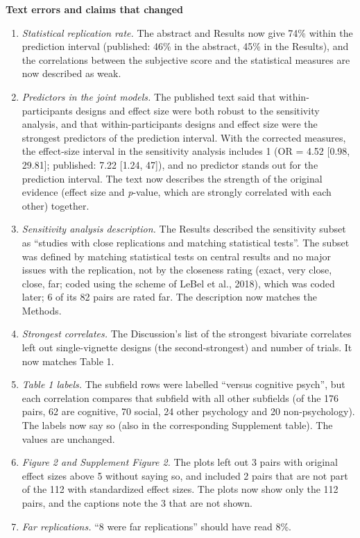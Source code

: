 \documentclass[
  english,
  a4paper,
]{article}
\providecommand{\tightlist}{%
  \setlength{\itemsep}{0pt}\setlength{\parskip}{0pt}}
\begin{document}
\textbf{Text errors and claims that changed}

\begin{enumerate}
\def\labelenumi{\arabic{enumi}.}
\tightlist
\item
  \emph{Statistical replication rate.} The abstract and Results now give 74\% within the prediction interval (published: 46\% in the abstract, 45\% in the Results), and the correlations between the subjective score and the statistical measures are now described as weak.
\item
  \emph{Predictors in the joint models.} The published text said that within-participants designs and effect size were both robust to the sensitivity analysis, and that within-participants designs and effect size were the strongest predictors of the prediction interval. With the corrected measures, the effect-size interval in the sensitivity analysis includes 1 (OR = 4.52 {[}0.98, 29.81{]}; published: 7.22 {[}1.24, 47{]}), and no predictor stands out for the prediction interval. The text now describes the strength of the original evidence (effect size and \emph{p}-value, which are strongly correlated with each other) together.
\item
  \emph{Sensitivity analysis description.} The Results described the sensitivity subset as ``studies with close replications and matching statistical tests''. The subset was defined by matching statistical tests on central results and no major issues with the replication, not by the closeness rating (exact, very close, close, far; coded using the scheme of LeBel et al., 2018), which was coded later; 6 of its 82 pairs are rated far. The description now matches the Methods.
\item
  \emph{Strongest correlates.} The Discussion's list of the strongest bivariate correlates left out single-vignette designs (the second-strongest) and number of trials. It now matches Table 1.
\item
  \emph{Table 1 labels.} The subfield rows were labelled ``versus cognitive psych'', but each correlation compares that subfield with all other subfields (of the 176 pairs, 62 are cognitive, 70 social, 24 other psychology and 20 non-psychology). The labels now say so (also in the corresponding Supplement table). The values are unchanged.
\item
  \emph{Figure 2 and Supplement Figure 2.} The plots left out 3 pairs with original effect sizes above 5 without saying so, and included 2 pairs that are not part of the 112 with standardized effect sizes. The plots now show only the 112 pairs, and the captions note the 3 that are not shown.
\item
  \emph{Far replications.} ``8 were far replications'' should have read 8\%.
\end{enumerate}
\end{document}
